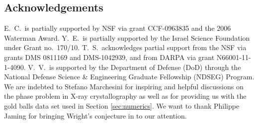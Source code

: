 \documentclass[11pt]{article}
\newcommand{\<}{\langle}
\renewcommand{\>}{\rangle}
\numberwithin{equation}{section}
\begin{document}
\begin{small}
\subsection*{Acknowledgements}

E.~C.\ is partially supported by NSF via grant CCF-0963835 and the
2006 Waterman Award. Y.~E.\ is partially supported by the Israel
Science Foundation under Grant no.\ 170/10. T.~S.\ acknowledges partial
support from the NSF via grants DMS 0811169 and DMS-1042939, and from
DARPA via grant N66001-11-1-4090. V.~V.\ is supported by the
Department of Defense (DoD) through the National Defense Science \&
Engineering Graduate Fellowship (NDSEG) Program. We are indebted to
Stefano Marchesini for inspiring and helpful discussions on the phase
problem in X-ray crystallography as well as for providing us with the
gold balls data set used in Section \ref{sec:numerics}. We want to
thank Philippe Jaming for bringing Wright's conjecture in
\cite{Vogt78} to our attention.



\end{small}

% 
\end{document}
